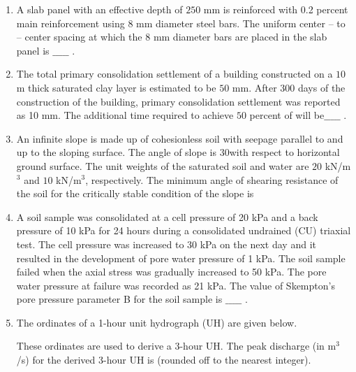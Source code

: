\documentclass[journal]{IEEEtran}
\begin{document}
\begin{enumerate}
\item A slab panel with an effective depth of $250$ mm is reinforced with 0.2 percent main
reinforcement using $8$ mm diameter steel bars. The uniform center -- to -- center
spacing  at which the $8$ mm diameter bars are placed in the slab panel is $\_\_\_\_\_$ .  
\hfill {}  

\item The total primary consolidation settlement  of a building constructed on a $10$ m thick saturated clay layer is estimated to be $50$ mm. After $300$ days of the
construction of the building, primary consolidation settlement was reported as
10 mm. The additional time  required to achieve $50$ percent of  will be$\_\_\_\_\_$ .  
\hfill {}  

\item An infinite slope is made up of cohesionless soil with seepage parallel to and up to
the sloping surface. The angle of slope is $30$\degree with respect to horizontal ground
surface. The unit weights of the saturated soil and water are $20$ kN/m$^3$ and $10$ kN/m$^3$,  respectively. The minimum angle of shearing resistance of the soil  for the critically stable condition of the slope is  
\hfill {}  

\item A soil sample was consolidated at a cell pressure of 20 kPa and a back pressure of
10 kPa for 24 hours during a consolidated undrained (CU) triaxial test. The cell
pressure was increased to 30 kPa on the next day and it resulted in the development
of pore water pressure of 1 kPa. The soil sample failed when the axial stress was
gradually increased to 50 kPa. The pore water pressure at failure was recorded as
21 kPa. The value of Skempton's pore pressure parameter B for the soil sample is $\_\_\_\_\_$ .  
\hfill {}  

\item The ordinates of a 1-hour unit hydrograph (UH) are given below. \hfill {}

 



These ordinates are used to derive a 3-hour UH. The peak discharge (in m$^3$/s) for the derived 3-hour UH is \underline{\hspace{2cm}} (rounded off to the nearest integer).


\end{enumerate}
\end{document}
